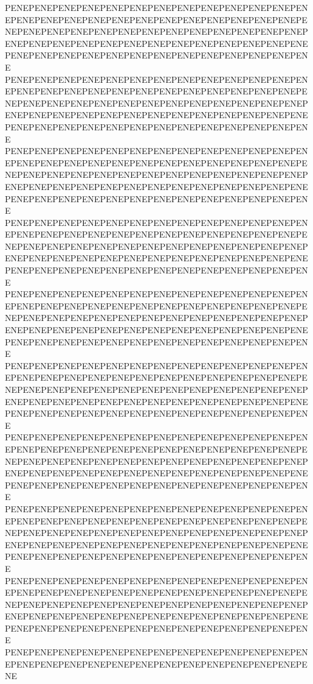 PENEPENEPENEPENEPENEPENEPENEPENEPENEPENEPENEPENEPENEPENEPENEPENEPENEPENEPENEPENEPENEPENEPENEPENEPENEPENEPENEPENEPENEPENEPENEPENEPENEPENEPENEPENEPENEPENEPENEPENEPENEPENEPENEPENEPENEPENEPENEPENEPENEPENEPENEPENEPENEPENEPENEPENEPENEPENEPENEPENEPENEPENEPENEPENE
PENEPENEPENEPENEPENEPENEPENEPENEPENEPENEPENEPENEPENEPENEPENEPENEPENEPENEPENEPENEPENEPENEPENEPENEPENEPENEPENEPENEPENEPENEPENEPENEPENEPENEPENEPENEPENEPENEPENEPENEPENEPENEPENEPENEPENEPENEPENEPENEPENEPENEPENEPENEPENEPENEPENEPENEPENEPENEPENEPENEPENEPENEPENEPENE
PENEPENEPENEPENEPENEPENEPENEPENEPENEPENEPENEPENEPENEPENEPENEPENEPENEPENEPENEPENEPENEPENEPENEPENEPENEPENEPENEPENEPENEPENEPENEPENEPENEPENEPENEPENEPENEPENEPENEPENEPENEPENEPENEPENEPENEPENEPENEPENEPENEPENEPENEPENEPENEPENEPENEPENEPENEPENEPENEPENEPENEPENEPENEPENE
PENEPENEPENEPENEPENEPENEPENEPENEPENEPENEPENEPENEPENEPENEPENEPENEPENEPENEPENEPENEPENEPENEPENEPENEPENEPENEPENEPENEPENEPENEPENEPENEPENEPENEPENEPENEPENEPENEPENEPENEPENEPENEPENEPENEPENEPENEPENEPENEPENEPENEPENEPENEPENEPENEPENEPENEPENEPENEPENEPENEPENEPENEPENEPENE
PENEPENEPENEPENEPENEPENEPENEPENEPENEPENEPENEPENEPENEPENEPENEPENEPENEPENEPENEPENEPENEPENEPENEPENEPENEPENEPENEPENEPENEPENEPENEPENEPENEPENEPENEPENEPENEPENEPENEPENEPENEPENEPENEPENEPENEPENEPENEPENEPENEPENEPENEPENEPENEPENEPENEPENEPENEPENEPENEPENEPENEPENEPENEPENE
PENEPENEPENEPENEPENEPENEPENEPENEPENEPENEPENEPENEPENEPENEPENEPENEPENEPENEPENEPENEPENEPENEPENEPENEPENEPENEPENEPENEPENEPENEPENEPENEPENEPENEPENEPENEPENEPENEPENEPENEPENEPENEPENEPENEPENEPENEPENEPENEPENEPENEPENEPENEPENEPENEPENEPENEPENEPENEPENEPENEPENEPENEPENEPENE
PENEPENEPENEPENEPENEPENEPENEPENEPENEPENEPENEPENEPENEPENEPENEPENEPENEPENEPENEPENEPENEPENEPENEPENEPENEPENEPENEPENEPENEPENEPENEPENEPENEPENEPENEPENEPENEPENEPENEPENEPENEPENEPENEPENEPENEPENEPENEPENEPENEPENEPENEPENEPENEPENEPENEPENEPENEPENEPENEPENEPENEPENEPENEPENE
PENEPENEPENEPENEPENEPENEPENEPENEPENEPENEPENEPENEPENEPENEPENEPENEPENEPENEPENEPENEPENEPENEPENEPENEPENEPENEPENEPENEPENEPENEPENEPENEPENEPENEPENEPENEPENEPENEPENEPENEPENEPENEPENEPENEPENEPENEPENEPENEPENEPENEPENEPENEPENEPENEPENEPENEPENEPENEPENEPENEPENEPENEPENEPENE
PENEPENEPENEPENEPENEPENEPENEPENEPENEPENEPENEPENEPENEPENEPENEPENEPENEPENEPENEPENEPENEPENEPENEPENEPENEPENEPENEPENEPENEPENEPENEPENEPENEPENEPENEPENEPENEPENEPENEPENEPENEPENEPENEPENEPENEPENEPENEPENEPENEPENEPENEPENEPENEPENEPENEPENEPENEPENEPENEPENEPENEPENEPENEPENE
PENEPENEPENEPENEPENEPENEPENEPENEPENEPENEPENEPENEPENEPENEPENEPENEPENEPENEPENEPENEPENEPENEPENEPENEPENEPENE
